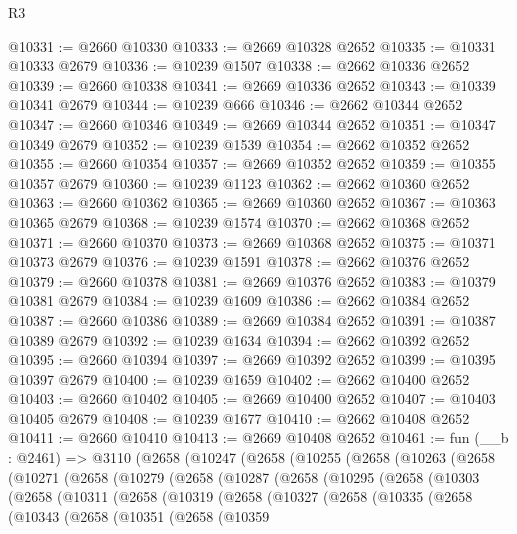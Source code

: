 \begin{lexlean}{R3}
\begin{coremodule}
@10331 := @2660 @10330
@10333 := @2669 @10328 @2652
@10335 := @10331 @10333 @2679
@10336 := @10239 @1507
@10338 := @2662 @10336 @2652
@10339 := @2660 @10338
@10341 := @2669 @10336 @2652
@10343 := @10339 @10341 @2679
@10344 := @10239 @666
@10346 := @2662 @10344 @2652
@10347 := @2660 @10346
@10349 := @2669 @10344 @2652
@10351 := @10347 @10349 @2679
@10352 := @10239 @1539
@10354 := @2662 @10352 @2652
@10355 := @2660 @10354
@10357 := @2669 @10352 @2652
@10359 := @10355 @10357 @2679
@10360 := @10239 @1123
@10362 := @2662 @10360 @2652
@10363 := @2660 @10362
@10365 := @2669 @10360 @2652
@10367 := @10363 @10365 @2679
@10368 := @10239 @1574
@10370 := @2662 @10368 @2652
@10371 := @2660 @10370
@10373 := @2669 @10368 @2652
@10375 := @10371 @10373 @2679
@10376 := @10239 @1591
@10378 := @2662 @10376 @2652
@10379 := @2660 @10378
@10381 := @2669 @10376 @2652
@10383 := @10379 @10381 @2679
@10384 := @10239 @1609
@10386 := @2662 @10384 @2652
@10387 := @2660 @10386
@10389 := @2669 @10384 @2652
@10391 := @10387 @10389 @2679
@10392 := @10239 @1634
@10394 := @2662 @10392 @2652
@10395 := @2660 @10394
@10397 := @2669 @10392 @2652
@10399 := @10395 @10397 @2679
@10400 := @10239 @1659
@10402 := @2662 @10400 @2652
@10403 := @2660 @10402
@10405 := @2669 @10400 @2652
@10407 := @10403 @10405 @2679
@10408 := @10239 @1677
@10410 := @2662 @10408 @2652
@10411 := @2660 @10410
@10413 := @2669 @10408 @2652
@10461 := fun (__b : @2461) =>
  @3110
    (@2658
      (@10247
        (@2658
          (@10255
            (@2658
              (@10263
                (@2658
                  (@10271
                    (@2658
                      (@10279
                        (@2658
                          (@10287
                            (@2658
                              (@10295
                                (@2658
                                  (@10303
                                    (@2658
                                      (@10311
                                        (@2658
                                          (@10319
                                            (@2658
                                              (@10327
                                                (@2658
                                                  (@10335
                                                    (@2658
                                                      (@10343
                                                        (@2658
                                                          (@10351
                                                            (@2658
                                                              (@10359

\end{coremodule}
\end{lexlean}
